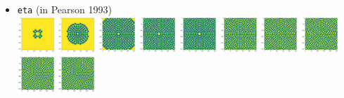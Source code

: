 \begin{itemize}
\item {\tt eta} (in Pearson 1993)\\
\includegraphics[width=1.4cm]{python_codes/fieldstone_171/pearson93/eta_solution_0001000_u}
\includegraphics[width=1.4cm]{python_codes/fieldstone_171/pearson93/eta_solution_0005000_u}
\includegraphics[width=1.4cm]{python_codes/fieldstone_171/pearson93/eta_solution_0010000_u}
\includegraphics[width=1.4cm]{python_codes/fieldstone_171/pearson93/eta_solution_0015000_u}
\includegraphics[width=1.4cm]{python_codes/fieldstone_171/pearson93/eta_solution_0020000_u}
\includegraphics[width=1.4cm]{python_codes/fieldstone_171/pearson93/eta_solution_0030000_u}
\includegraphics[width=1.4cm]{python_codes/fieldstone_171/pearson93/eta_solution_0040000_u}
\includegraphics[width=1.4cm]{python_codes/fieldstone_171/pearson93/eta_solution_0050000_u}
\includegraphics[width=1.4cm]{python_codes/fieldstone_171/pearson93/eta_solution_0075000_u}
\includegraphics[width=1.4cm]{python_codes/fieldstone_171/pearson93/eta_solution_final_u}


\end{itemize}
